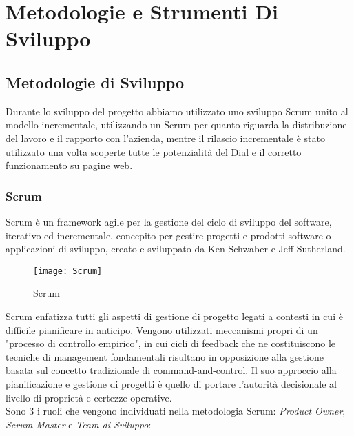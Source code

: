 
\chapter{Metodologie e Strumenti Di Sviluppo}
\label{chap:metod}

\section{Metodologie di Sviluppo}
Durante lo sviluppo del progetto abbiamo utilizzato uno sviluppo Scrum\cite{scr} unito al modello incrementale, utilizzando un Scrum per quanto riguarda la distribuzione del lavoro e il rapporto con l'azienda, mentre il rilascio incrementale è stato utilizzato una volta scoperte tutte le potenzialità del Dial e il corretto funzionamento su pagine web.

\subsection{Scrum}
 
Scrum è un framework agile per la gestione del ciclo di sviluppo del software, iterativo ed incrementale, concepito per gestire progetti e prodotti software o applicazioni di sviluppo, creato e sviluppato da Ken Schwaber e Jeff Sutherland.\\

\begin{figure}[htpb!]
\center
  \texttt{[image: Scrum]}
  \caption{Scrum}
\end{figure}

Scrum enfatizza tutti gli aspetti di gestione di progetto legati a contesti in cui è difficile pianificare in anticipo. Vengono utilizzati meccanismi propri di un "processo di controllo empirico", in cui cicli di feedback che ne costituiscono le tecniche di management fondamentali risultano in opposizione alla gestione basata sul concetto tradizionale di command-and-control. Il suo approccio alla pianificazione e gestione di progetti è quello di portare l'autorità decisionale al livello di proprietà e certezze operative.\\

Sono 3 i ruoli che vengono individuati nella metodologia Scrum: \emph{Product Owner}, \emph{Scrum Master} e \emph{Team di Sviluppo}:

